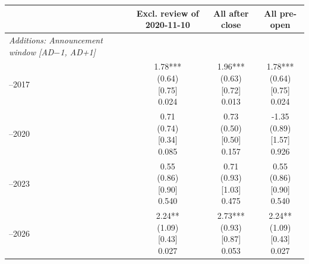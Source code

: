 \begin{threeparttable}
\begingroup
\renewcommand\cellalign{t}
\renewcommand\arraystretch{1}
\setlength{\tabcolsep}{5pt}
\begin{tabular}{@{}lccc}
\toprule
 & Excl. review of 2020-11-10 & All after close & All pre-open \\
\midrule
\emph{Additions: Announcement window [AD$-$1, AD+1]} \\
\addlinespace[0.25ex]
\addlinespace[1ex]
2013–2017 & \makecell{1.78***\\(0.64)\\{}[0.75]\\{0.024}} & \makecell{1.96***\\(0.63)\\{}[0.72]\\{0.013}} & \makecell{1.78***\\(0.64)\\{}[0.75]\\{0.024}} \\
\addlinespace[0.25ex]
\addlinespace[0.25ex]
2018–2020 & \makecell{0.71\\(0.74)\\{}[0.34]\\{0.085}} & \makecell{0.73\\(0.50)\\{}[0.50]\\{0.157}} & \makecell{-1.35\\(0.89)\\{}[1.57]\\{0.926}} \\
\addlinespace[0.25ex]
\addlinespace[0.25ex]
2021–2023 & \makecell{0.55\\(0.86)\\{}[0.90]\\{0.540}} & \makecell{0.71\\(0.93)\\{}[1.03]\\{0.475}} & \makecell{0.55\\(0.86)\\{}[0.90]\\{0.540}} \\
\addlinespace[0.25ex]
\addlinespace[0.25ex]
2024–2026 & \makecell{2.24**\\(1.09)\\{}[0.43]\\{0.027}} & \makecell{2.73***\\(0.93)\\{}[0.87]\\{0.053}} & \makecell{2.24**\\(1.09)\\{}[0.43]\\{0.027}} \\

\end{tabular}
\end{threeparttable}
